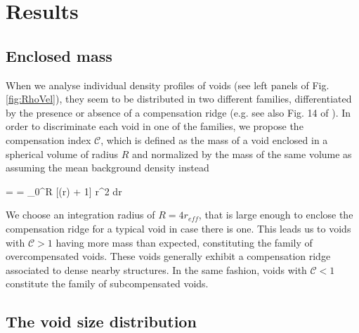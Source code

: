 \documentclass[a4,useAMS,usenatbib,usegraphicx]{latex/mn2e}
\begin{document}
\section{Results}
\label{sec:results}


\subsection{Enclosed mass}
\label{subsec:enclosedmass}


When we analyse individual density profiles of voids (see left panels of
Fig. \ref{fig:RhoVel}), they seem to be distributed in two different 
families, differentiated by the presence or absence of a compensation 
ridge (e.g. see also Fig. 14 of \citet{Colberg05}). In order to 
discriminate each void in one of the families, we propose the compensation 
index $\mathcal{C}$, which is defined as the mass of a void enclosed in a 
spherical volume of radius $R$ and normalized by the mass of the same 
volume as assuming the mean background density instead

{ =  =  \int_0^{R} [\delta(r) + 1] r^2 dr}

We choose an integration radius of $R=4r_{eff}$, that is large enough to 
enclose the compensation ridge for a typical void in case there is one. 
This leads us to voids with $\mathcal{C}>1$ having more mass than expected, 
constituting the family of overcompensated voids. These voids generally 
exhibit a compensation ridge associated to dense nearby structures. In the 
same fashion, voids with $\mathcal{C}<1$ constitute the family of 
subcompensated voids.


\subsection{The void size distribution}
\label{subsec:shape_voids}
\end{document}
